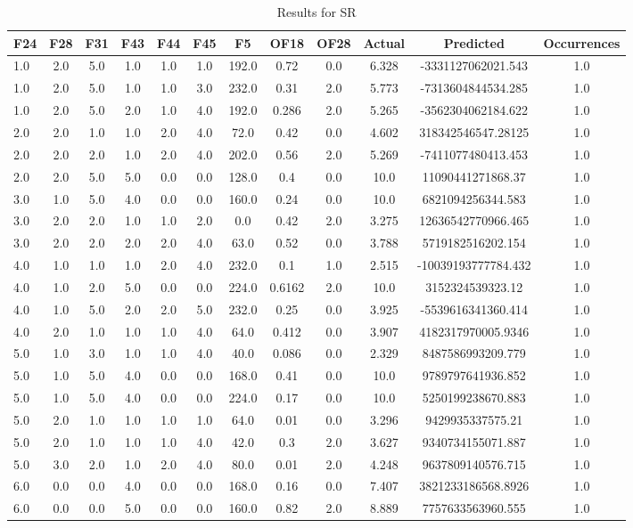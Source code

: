 \begin{table}[htbp]
\centering
\begin{tabular}{|l|c|c|c|c|c|c|c|c|c|c|c|}
\hline
F24 & F28 & F31 & F43 & F44 & F45 & F5 & OF18 & OF28 & Actual & Predicted & Occurrences \\
\hline
1.0 & 2.0 & 5.0 & 1.0 & 1.0 & 1.0 & 192.0 & 0.72 & 0.0 & 6.328 & -3331127062021.543 & 1.0 \\
1.0 & 2.0 & 5.0 & 1.0 & 1.0 & 3.0 & 232.0 & 0.31 & 2.0 & 5.773 & -7313604844534.285 & 1.0 \\
1.0 & 2.0 & 5.0 & 2.0 & 1.0 & 4.0 & 192.0 & 0.286 & 2.0 & 5.265 & -3562304062184.622 & 1.0 \\
2.0 & 2.0 & 1.0 & 1.0 & 2.0 & 4.0 & 72.0 & 0.42 & 0.0 & 4.602 & 318342546547.28125 & 1.0 \\
2.0 & 2.0 & 2.0 & 1.0 & 2.0 & 4.0 & 202.0 & 0.56 & 2.0 & 5.269 & -7411077480413.453 & 1.0 \\
2.0 & 2.0 & 5.0 & 5.0 & 0.0 & 0.0 & 128.0 & 0.4 & 0.0 & 10.0 & 11090441271868.37 & 1.0 \\
3.0 & 1.0 & 5.0 & 4.0 & 0.0 & 0.0 & 160.0 & 0.24 & 0.0 & 10.0 & 6821094256344.583 & 1.0 \\
3.0 & 2.0 & 2.0 & 1.0 & 1.0 & 2.0 & 0.0 & 0.42 & 2.0 & 3.275 & 12636542770966.465 & 1.0 \\
3.0 & 2.0 & 2.0 & 2.0 & 2.0 & 4.0 & 63.0 & 0.52 & 0.0 & 3.788 & 5719182516202.154 & 1.0 \\
4.0 & 1.0 & 1.0 & 1.0 & 2.0 & 4.0 & 232.0 & 0.1 & 1.0 & 2.515 & -10039193777784.432 & 1.0 \\
4.0 & 1.0 & 2.0 & 5.0 & 0.0 & 0.0 & 224.0 & 0.6162 & 2.0 & 10.0 & 3152324539323.12 & 1.0 \\
4.0 & 1.0 & 5.0 & 2.0 & 2.0 & 5.0 & 232.0 & 0.25 & 0.0 & 3.925 & -5539616341360.414 & 1.0 \\
4.0 & 2.0 & 1.0 & 1.0 & 1.0 & 4.0 & 64.0 & 0.412 & 0.0 & 3.907 & 4182317970005.9346 & 1.0 \\
5.0 & 1.0 & 3.0 & 1.0 & 1.0 & 4.0 & 40.0 & 0.086 & 0.0 & 2.329 & 8487586993209.779 & 1.0 \\
5.0 & 1.0 & 5.0 & 4.0 & 0.0 & 0.0 & 168.0 & 0.41 & 0.0 & 10.0 & 9789797641936.852 & 1.0 \\
5.0 & 1.0 & 5.0 & 4.0 & 0.0 & 0.0 & 224.0 & 0.17 & 0.0 & 10.0 & 5250199238670.883 & 1.0 \\
5.0 & 2.0 & 1.0 & 1.0 & 1.0 & 1.0 & 64.0 & 0.01 & 0.0 & 3.296 & 9429935337575.21 & 1.0 \\
5.0 & 2.0 & 1.0 & 1.0 & 1.0 & 4.0 & 42.0 & 0.3 & 2.0 & 3.627 & 9340734155071.887 & 1.0 \\
5.0 & 3.0 & 2.0 & 1.0 & 2.0 & 4.0 & 80.0 & 0.01 & 2.0 & 4.248 & 9637809140576.715 & 1.0 \\
6.0 & 0.0 & 0.0 & 4.0 & 0.0 & 0.0 & 168.0 & 0.16 & 0.0 & 7.407 & 3821233186568.8926 & 1.0 \\
6.0 & 0.0 & 0.0 & 5.0 & 0.0 & 0.0 & 160.0 & 0.82 & 2.0 & 8.889 & 7757633563960.555 & 1.0 \\
\hline
\end{tabular}
\caption{Results for SR}
\label{tab:SR_results}
\end{table}
